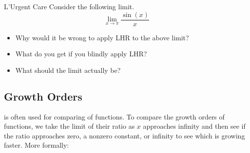 \begin{exercise}{L'Urgent Care \Coffeecup \Coffeecup }
Consider the following limit.
$$ {\lim_{x \to \pi }}  \frac{\sin(x)}{x} $$
\begin{itemize}
\item Why would it be wrong to apply LHR to the above limit?
\item  What do you get if you blindly apply LHR?
\item  What should the limit actually be?
\end{itemize}
\end{exercise}

\subsection{Growth Orders}\label{tomato} 

 is often used for comparing  of functions.  To compare the growth orders of functions, we take the limit of their ratio as $x$ approaches infinity and then see if the ratio approaches zero, a nonzero constant, or infinity to see which is growing faster.  More formally:

